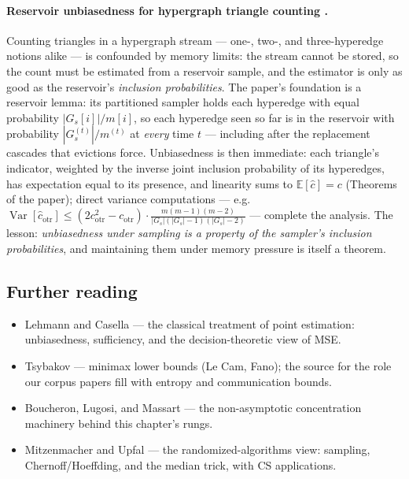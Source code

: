 \paragraph{Reservoir unbiasedness for hypergraph triangle counting \citep{sigmod26-377}.}
Counting triangles in a hypergraph stream --- one-, two-, and three-hyperedge notions
alike --- is confounded by memory limits: the stream cannot be stored, so the count must
be estimated from a reservoir sample, and the estimator is only as good as the
reservoir's \emph{inclusion probabilities}. The paper's foundation is a reservoir lemma:
its partitioned sampler holds each hyperedge with equal probability $|G_s[i]|/m[i]$, so
each hyperedge seen so far is in the reservoir with probability $|G_s^{(t)}|/m^{(t)}$ at
\emph{every} time $t$ --- including after the replacement cascades that evictions force.
Unbiasedness is then immediate: each triangle's indicator, weighted by the inverse joint
inclusion probability of its hyperedges, has expectation equal to its presence, and
linearity sums to $\mathbb{E}[\hat c] = c$ (Theorems of the paper); direct variance
computations --- e.g.\ $\operatorname{Var}[\hat c_{\mathrm{otr}}] \le
(2c_{\mathrm{otr}}^2 - c_{\mathrm{otr}})\cdot
\frac{m(m-1)(m-2)}{|G_s|(|G_s|-1)(|G_s|-2)}$ --- complete the analysis. The lesson:
\emph{unbiasedness under sampling is a property of the sampler's inclusion
probabilities}, and maintaining them under memory pressure is itself a theorem.

\subsection{Further reading}

\begin{itemize}
\item Lehmann and Casella \citep{estimation-theory-bg1} --- the classical treatment of point
  estimation: unbiasedness, sufficiency, and the decision-theoretic view of MSE.
\item Tsybakov \citep{estimation-theory-bg2} --- minimax lower bounds (Le Cam, Fano); the
  source for the role our corpus papers fill with entropy and communication bounds.
\item Boucheron, Lugosi, and Massart \citep{estimation-theory-bg3} --- the non-asymptotic
  concentration machinery behind this chapter's rungs.
\item Mitzenmacher and Upfal \citep{estimation-theory-bg4} --- the randomized-algorithms view:
  sampling, Chernoff/Hoeffding, and the median trick, with CS applications.
\end{itemize}

